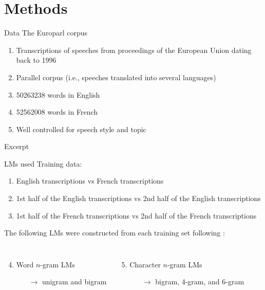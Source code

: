\documentclass{beamer}\usepackage[]{graphicx}\usepackage[]{color}
\newcommand{\corp}[1]{\texttt{#1}}
\begin{document}
  \section{Methods}
    \begin{frame}{Data}
      The Europarl corpus \parencite{koehn_europarl:_2009}
      \begin{enumerate}
        \item Transcriptions of speeches from proceedings of the European Union dating back to 1996
        \item Parallel corpus (i.e., speeches translated into several languages)
        \item \num{50263238} words in English
        \item \num{52562008} words in French
        \item Well controlled for speech style and topic
      \end{enumerate}
      \begin{block}{Excerpt}
        \corp{}
      \end{block}
    \end{frame}

    \begin{frame}{LMs used}
      Training data:
      \begin{enumerate}
        \item English transcriptions vs French transcriptions
        \item 1st half of the English transcriptions vs 2nd half of the English transcriptions
        \item 1st half of the French transcriptions vs 2nd half of the French transcriptions
      \end{enumerate}
      The following LMs were constructed from each training set following \textcite{duvenhage_short_2019}:
      \begin{columns}
          \begin{enumerate}
            \setcounter{enumi}{3}
            \item Word $n$-gram LMs
            \begin{itemize}
              \item[$\to$] unigram and bigram
            \end{itemize}
          \end{enumerate}
          \begin{enumerate}
            \setcounter{enumi}{4}
            \item Character $n$-gram LMs
            \begin{itemize}
              \item[$\to$] bigram, 4-gram, and 6-gram
            \end{itemize}
          \end{enumerate}
      \end{columns}
    \end{frame}
\end{document}
